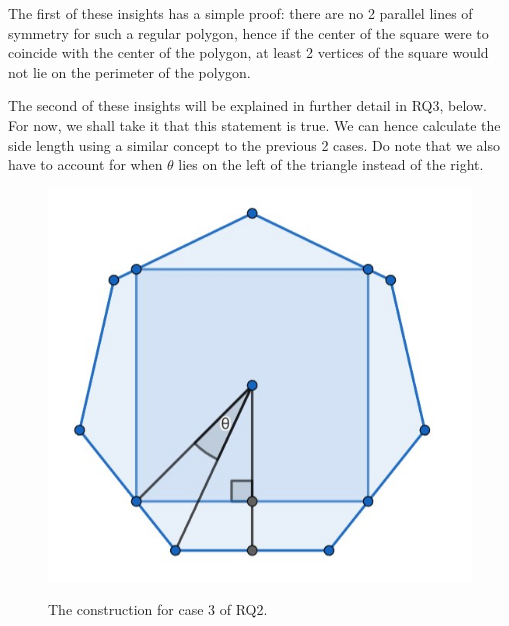 \documentclass[12pt]{scrartcl}
\begin{document}
The first of these insights has a simple proof: there are no 2 parallel lines of symmetry for such a regular polygon, hence if the center of the square were to coincide with the center of the polygon, at least 2 vertices of the square would not lie on the perimeter of the polygon.

The second of these insights will be explained in further detail in RQ3, below. For now, we shall take it that this statement is true. We can hence calculate the side length using a similar concept to the previous 2 cases. Do note that we also have to account for when $\theta$ lies on the left of the triangle instead of the right.

\begin{figure}[htpb]
	\centering
	\includegraphics[scale=.75]{images/rq2_3.jpg}
	\label{fig:rq2_3_img}
	\caption{The construction for case 3 of RQ2.}
\end{figure}
\end{document}
